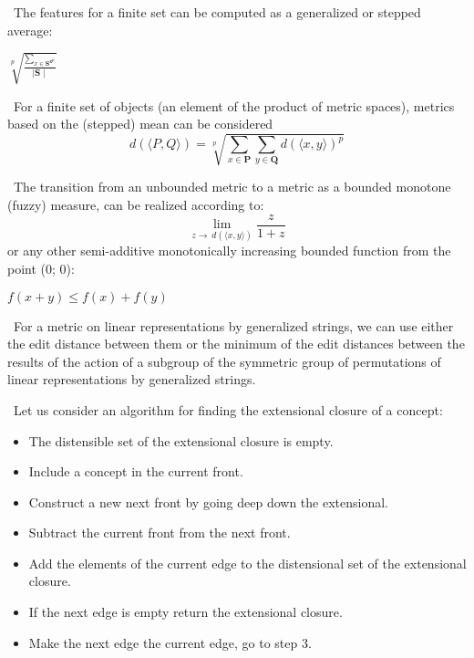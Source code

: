 \documentclass[10pt, a4paper]{article}
\begin{document}
\fontsize{10}{14}\selectfont
\begin{multicols}{2}
\setlength{\parindent}{0.8cm}
\setlength{\parindent}{0.4cm}
\fontsize{10}{15}\selectfont
\par\ The features for a finite set can be computed as a
generalized or stepped average:
\begin{center}
 $\sqrt[p]{\frac{\sum_{x\in\mathbf{S^{{x}^{p}}}}}{\mid{\mathbf{S}\mid} }}$\qquad      
\end{center} 
\par\  For a finite set of objects (an element of the product
of metric spaces), metrics based on the (stepped) mean
can be considered
\[d(\langle P,Q \rangle)=\sqrt[p]{\sum_ { x \in\mathbf{P}}\sum_ { y \in\mathbf{Q}}d(\langle x,y \rangle)^p }\]
\par\  The transition from an unbounded metric to a metric
as a bounded monotone (fuzzy) measure, can be realized
according to:
\[\lim_ { z \to\ d(\langle x,y \rangle) }
    \frac{z}{1+z}\]
or any other semi-additive monotonically increasing
bounded function from the point (0; 0):
\begin{center}
    $f(x+y)\le f(x)+f(y)$
\end{center}
\par\ For a metric on linear representations by generalized
strings, we can use either the edit distance between them
or the minimum of the edit distances between the results
of the action of a subgroup of the symmetric group
of permutations of linear representations by generalized
strings.
\par \ Let us consider an algorithm for finding the extensional closure of a concept:
\begin{itemize} [noitemsep] \fontsize{10}{15}\selectfont
    \item[1] The distensible set of the extensional closure is empty.
    \item[2] Include a concept in the current front.
    \item[3] Construct a new next front by going deep down the extensional.
    \item[4]  Subtract the current front from the next front.
    \item[5] Add the elements of the current edge to the distensional set of the extensional closure.
    \item[6] If the next edge is empty return the extensional closure.
    \item[7] Make the next edge the current edge, go to step 3.
    

\end{itemize}
\end{multicols}
\end{document}
